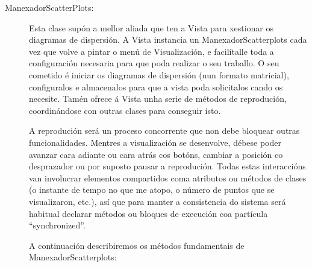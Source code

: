 \begin{description}
\item[ManexadorScatterPlots:] \hfill
Esta clase supón a mellor aliada que ten a Vista para xestionar os diagramas de dispersión. A Vista instancia un ManexadorScatterplots cada vez que volve a pintar o menú de Visualización, e facilítalle toda a configuración necesaria para que poda realizar o seu traballo. O seu cometido é iniciar os diagramas de dispersión (nun formato matricial), configuralos e almacenalos para que a vista poda solicitalos cando os necesite. Tamén ofrece á Vista unha serie de métodos de reprodución, coordinándose con outras clases para conseguir isto.

A reprodución será un proceso concorrente que non debe bloquear outras funcionalidades. Mentres a visualización se desenvolve, débese poder avanzar cara adiante ou cara atrás cos botóns, cambiar a posición co desprazador ou por suposto pausar a reprodución. Todas estas interaccións van involucrar elementos compartidos coma atributos ou métodos de clases (o instante de tempo no que me atopo, o número de puntos que se visualizaron, etc.), así que para manter a consistencia do sistema será habitual declarar métodos ou bloques de execución coa partícula ``synchronized''.

A continuación describiremos os métodos fundamentais de ManexadorScatterplots:


\end{description}
